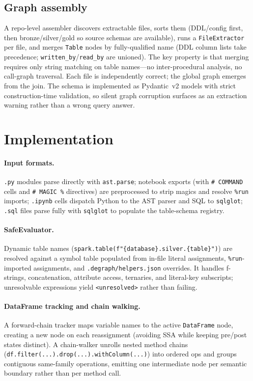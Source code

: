 \documentclass[11pt]{article}
\newcommand{\code}[1]{\texttt{#1}}
\begin{document}
\subsection{Graph assembly}
A repo-level assembler discovers extractable files, sorts them (DDL/config first,
then bronze/silver/gold so source schemas are available), runs a \code{FileExtractor}
per file, and merges \code{Table} nodes by fully-qualified name (DDL column lists
take precedence; \code{written_by}/\code{read_by} are unioned). The key property is
that merging requires only string matching on table names---no inter-procedural
analysis, no call-graph traversal. Each file is independently correct; the global
graph emerges from the join. The schema is implemented as Pydantic~v2 models with
strict construction-time validation, so silent graph corruption surfaces as an
extraction warning rather than a wrong query answer.

\section{Implementation}

\paragraph{Input formats.} \code{.py} modules parse directly with \code{ast.parse};
notebook exports (with \code{\# COMMAND} cells and \code{\# MAGIC \%} directives) are
preprocessed to strip magics and resolve \code{\%run} imports; \code{.ipynb} cells
dispatch Python to the AST parser and SQL to \code{sqlglot}; \code{.sql} files parse
fully with \code{sqlglot} to populate the table-schema registry.

\paragraph{SafeEvaluator.} Dynamic table names
(\code{spark.\allowbreak table(f"\{database\}.\allowbreak silver.\allowbreak \{table\}")}) are resolved against a symbol
table populated from in-file literal assignments, \code{\%run}-imported assignments,
and \code{.degraph/\allowbreak helpers.\allowbreak json} overrides. It handles f-strings, concatenation,
attribute access, ternaries, and literal-key subscripts; unresolvable expressions
yield \code{<unresolved>} rather than failing.

\paragraph{DataFrame tracking and chain walking.} A forward-chain tracker maps
variable names to the active \code{DataFrame} node, creating a new node on each
reassignment (avoiding SSA while keeping pre/post states distinct). A chain-walker
unrolls nested method chains
(\code{df.\allowbreak filter(.\allowbreak .\allowbreak .\allowbreak ).\allowbreak drop(.\allowbreak .\allowbreak .\allowbreak ).\allowbreak withColumn(.\allowbreak .\allowbreak .\allowbreak )}) into ordered ops and groups
contiguous same-family operations, emitting one intermediate node per semantic
boundary rather than per method call.
\end{document}
